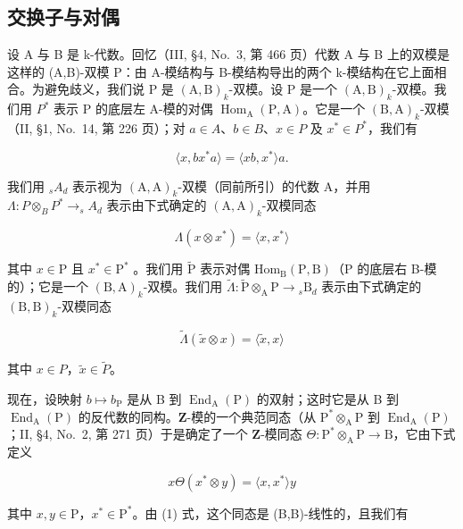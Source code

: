 \subsection{交换子与对偶}

设 A 与 B 是 k-代数。回忆（III, §4, No.~3, 第 466 页）代数 A 与 B 上的双模是这样的 (A,B)-双模 P：由 A-模结构与 B-模结构导出的两个 k-模结构在它上面相合。为避免歧义，我们说 P 是 \((\mathrm{A},\mathrm{B})_{k}\)-双模。设 P 是一个 \((\mathrm{A},\mathrm{B})_{k}\)-双模。我们用 \(P^{*}\) 表示 P 的底层左 A-模的对偶 \(\operatorname{Hom}_{\mathrm{A}}(\mathrm{P},\mathrm{A})\)。它是一个 \((\mathrm{B},\mathrm{A})_{k}\)-双模（II, §1, No.~14, 第 226 页）；对 \(a \in A\)、\(b \in B\)、\(x \in P\) 及 \(x^{*} \in P^{*}\)，我们有

\[
\langle x, b x ^ {*} a \rangle = \langle x b, x ^ {*} \rangle a.\tag{1}
\]

我们用 \(_{s}A_{d}\) 表示视为 \((\mathrm{A},\mathrm{A})_{k}\)-双模（同前所引）的代数 A，并用 \(\Lambda:P\otimes_{B}P^{*}\to_{s}A_{d}\) 表示由下式确定的 \((\mathrm{A},\mathrm{A})_{k}\)-双模同态

\[
\Lambda (x \otimes x ^ {*}) = \langle x, x ^ {*} \rangle\tag{2}
\]

其中 \(x \in \mathrm{P}\) 且 \(x^{*} \in \mathrm{P}^{*}\) 。我们用 \(\widetilde{\mathrm{P}}\) 表示对偶 \(\mathrm{Hom}_{\mathrm{B}}(\mathrm{P},\mathrm{B})\)（\(\mathrm{P}\) 的底层右 B-模的）；它是一个 \((\mathrm{B},\mathrm{A})_{k}\)-双模。我们用 \(\widetilde{\Lambda}: \widetilde{\mathrm{P}} \otimes_{\mathrm{A}} \mathrm{P} \to {}_{s}\mathrm{B}_{d}\) 表示由下式确定的 \((\mathrm{B},\mathrm{B})_{k}\)-双模同态

\[
\widetilde {\Lambda} (\widetilde {x} \otimes x) = \langle \widetilde {x}, x \rangle\tag{3}
\]

其中 \(x \in P\)，\(\widetilde{x} \in \widetilde{P}\)。

现在，设映射 \(b \mapsto b_{\mathrm{P}}\) 是从 B 到 \(\operatorname{End}_{\mathrm{A}}(\mathrm{P})\) 的双射；这时它是从 B 到 \(\operatorname{End}_{\mathrm{A}}(\mathrm{P})\) 的反代数的同构。\(\mathbf{Z}\)-模的一个典范同态（从 \(\mathrm{P}^* \otimes_{\mathrm{A}} \mathrm{P}\) 到 \(\operatorname{End}_{\mathrm{A}}(\mathrm{P})\)；II, §4, No.~2, 第 271 页）于是确定了一个 \(\mathbf{Z}\)-模同态 \(\Theta: \mathrm{P}^* \otimes_{\mathrm{A}} \mathrm{P} \to \mathrm{B}\)，它由下式定义

\[
x \Theta (x ^ {*} \otimes y) = \langle x, x ^ {*} \rangle y\tag{4}
\]

其中 \(x, y \in \mathrm{P}\)，\(x^{*} \in \mathrm{P}^{*}\)。由 (1) 式，这个同态是 (B,B)-线性的，且我们有

